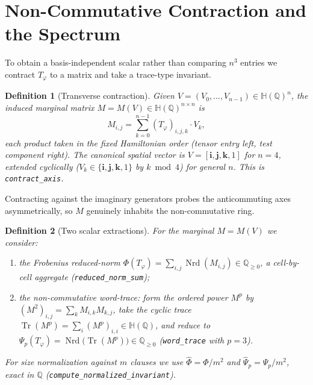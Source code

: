 \documentclass[pdflatex,sn-mathphys-num]{sn-jnl}
\theoremstyle{thmstyleone}%
\theoremstyle{thmstyletwo}%
\theoremstyle{thmstylethree}%
\newtheorem{definition}{Definition}%
\newcommand{\HH}{\mathbb{H}}
\newcommand{\QQ}{\mathbb{Q}}
\newcommand{\Nrd}{\operatorname{Nrd}}
\newcommand{\Tr}{\operatorname{Tr}}
\newcommand{\bi}{\mathbf{i}}
\newcommand{\bj}{\mathbf{j}}
\newcommand{\bk}{\mathbf{k}}
\newcommand{\Tphi}{T_{\varphi}}
\begin{document}
\newpage

\section{Non-Commutative Contraction and the Spectrum}\label{sec:contract}

To obtain a basis-independent scalar rather than comparing $n^3$ entries we
contract $\Tphi$ to a matrix and take a trace-type invariant.

\begin{definition}[Transverse contraction]\label{def:contract}
Given $V=(V_0,\dots,V_{n-1})\in\HH(\QQ)^n$, the induced marginal matrix
$M=M(V)\in\HH(\QQ)^{n\times n}$ is
\begin{equation}\label{eq:contract}
  M_{i,j}=\sum_{k=0}^{n-1}(\Tphi)_{i,j,k}\cdot V_k,
\end{equation}
each product taken in the fixed Hamiltonian order (tensor entry left, test
component right). The \emph{canonical spatial vector} is $V=[\bi,\bj,\bk,1]$
for $n=4$, extended cyclically ($V_k\in\{\bi,\bj,\bk,1\}$ by $k\bmod4$) for
general $n$. This is \texttt{contract\_axis}.
\end{definition}

Contracting against the imaginary generators probes the anticommuting axes
asymmetrically, so $M$ genuinely inhabits the non-commutative ring.

\begin{definition}[Two scalar extractions]\label{def:invariants}
For the marginal $M=M(V)$ we consider:
\begin{enumerate}
\item the \emph{Frobenius reduced-norm}
$\Phi(\Tphi)=\sum_{i,j}\Nrd(M_{i,j})\in\QQ_{\ge0}$, a cell-by-cell aggregate
(\texttt{reduced\_norm\_sum});
\item the \emph{non-commutative word-trace}: form the ordered power
$M^p$ by $(M^2)_{i,j}=\sum_k M_{i,k}M_{k,j}$, take the cyclic trace
$\Tr(M^p)=\sum_i(M^p)_{i,i}\in\HH(\QQ)$, and reduce to
$\Psi_p(\Tphi)=\Nrd\big(\Tr(M^p)\big)\in\QQ_{\ge0}$ (\texttt{word\_trace}
with $p=3$).
\end{enumerate}
For size normalization against $m$ clauses we use
$\widehat\Phi=\Phi/m^2$ and $\widehat\Psi_p=\Psi_p/m^2$, exact in $\QQ$
(\texttt{compute\_normalized\_invariant}).
\end{definition}
\end{document}
